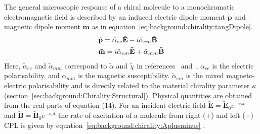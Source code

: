 The general microscopic response of a chiral molecule to a monochromatic electromagnetic field is described by an induced electric dipole moment $\mathbf{\tilde p}$ and magnetic dipole moment $\mathbf{\tilde m}$ as in equation~\ref{eq:background:chirality:tangDipole}.
\begin{equation}
    \label{eq:background:chirality:tangDipole}
    \begin{split}
        &{\bf{\tilde p}} = {{\tilde \alpha }_{ee}}{\bf{\tilde E}} - i{{\tilde \alpha }_{em}}{\bf{\tilde B}} \\
        &{\bf{\tilde m}} = i{{\tilde \alpha }_{em}}{\bf{\tilde E}} + {{\tilde \alpha }_{mm}}{\bf{\tilde B}}
    \end{split}
\end{equation}
Here, $\tilde{\alpha}_{ee}$ and $\tilde{\alpha}_{mm}$ correspond to $\tilde{\alpha}$ and $\tilde{\chi}$ in references~\cite{Tang2010} and~\cite{Choi2012}, 
$\alpha_{ee}$ is the electric polarisability, and $\alpha_{mm}$ is the magnetic susceptibility. $\tilde{\alpha}_{em}$ is the mixed magneto-electric polarisability and is directly related to the material chirality parameter $\kappa$ (section~\ref{sec:background:Chirality:Structural}).
Physical quantities are obtained from the real parts of equation (14). For an incident electric field $\mathbf{\tilde{E}}=\mathbf{\tilde{E}}_{0}{e}^{-i\omega t}$ and $\mathbf{\tilde{B}}=\mathbf{\tilde{B}}_{0}{e}^{-i\omega t}$ the rate of excitation of a molecule from right ($+$) and left ($-$) CPL is given by equation~\ref{eq:background:chirality:Aplusminus} \cite{Tang2010, Choi2012}.

